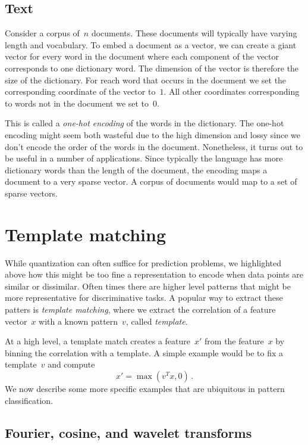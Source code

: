 \documentclass{tufte-book}
\begin{document}
\hypertarget{text}{%
\subsection{Text}\label{text}}

Consider a corpus of~\(n\) documents. These documents will typically
have varying length and vocabulary. To embed a document as a vector, we
can create a giant vector for every word in the document where each
component of the vector corresponds to one dictionary word. The
dimension of the vector is therefore the size of the dictionary. For
reach word that occurs in the document we set the corresponding
coordinate of the vector to~\(1\). All other coordinates corresponding
to words not in the document we set to~\(0\).

This is called a \emph{one-hot encoding} of the words in the
dictionary. The one-hot encoding might seem both
wasteful due to the high dimension and lossy since we don't encode the
order of the words in the document. Nonetheless, it turns out to be
useful in a number of applications. Since typically the language has
more dictionary words than the length of the document, the encoding maps
a document to a very sparse vector. A corpus of documents would map to a
set of sparse vectors.

\hypertarget{template-matching}{%
\section{Template matching}\label{template-matching}}


While quantization can often suffice for prediction problems, we
highlighted above how this might be too fine a representation to encode
when data points are similar or dissimilar. Often times there are higher
level patterns that might be more representative for discriminative
tasks. A popular way to extract these patters is \emph{template
matching}, where we extract the correlation of a feature vector~\(x\)
with a known pattern~\(v\), called \emph{template}.

At a high level, a template match creates a feature~\(x'\) from the
feature~\(x\) by binning the correlation with a template. A simple
example would be to fix a template~\(v\) and compute \[
    x' = \max(v^T x,0)\,.
\] We now describe some more specific examples that are ubiquitous in
pattern classification.

\hypertarget{fourier-cosine-and-wavelet-transforms}{%
\subsection{Fourier, cosine, and wavelet
transforms}\label{fourier-cosine-and-wavelet-transforms}}
\end{document}
